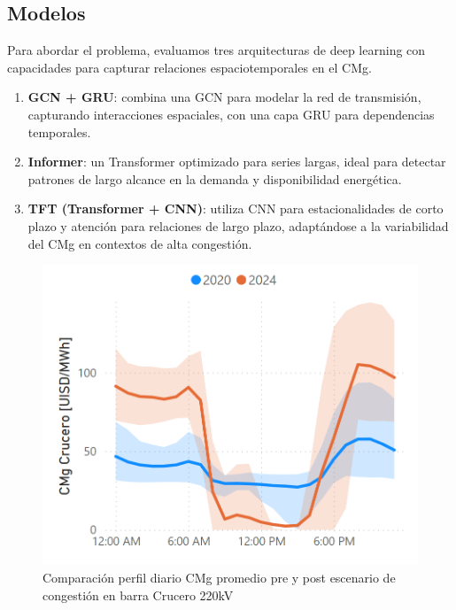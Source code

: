 \documentclass[twocolumn]{article}
\begin{document}
\subsection{Modelos}
Para abordar el problema, evaluamos tres arquitecturas de deep learning con capacidades para capturar relaciones espaciotemporales en el CMg.
\begin{enumerate}
    \item \textbf{GCN + GRU}: combina una GCN para modelar la red de transmisión, capturando interacciones espaciales, con una capa GRU para dependencias temporales.
    \item \textbf{Informer}: un Transformer optimizado para series largas, ideal para detectar patrones de largo alcance en la demanda y disponibilidad energética.
    \item \textbf{TFT (Transformer + CNN)}: utiliza CNN para estacionalidades de corto plazo y atención para relaciones de largo plazo, adaptándose a la variabilidad del CMg en contextos de alta congestión.
\end{enumerate}

\begin{figure}[htbp]
    \centering
    \includegraphics[width=1\columnwidth]{cmg_comparacion.png}
    \caption{Comparación perfil diario CMg promedio pre y post escenario de congestión en barra Crucero 220kV}
    \label{fig:comp_cmg}
\end{figure}
\end{document}
